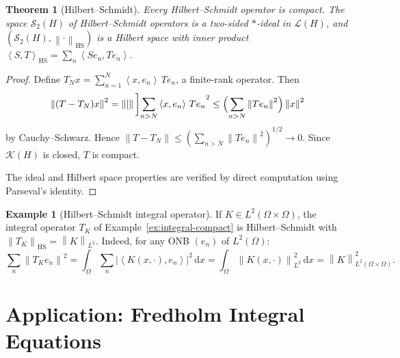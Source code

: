 \documentclass[a4paper,12pt]{book}
\newcommand{\dd}{\mathrm{d}}
\newcommand{\norm}[1]{\left\| #1 \right\|}
\newcommand{\abs}[1]{\left| #1 \right|}
\newcommand{\inner}[2]{\left\langle #1, #2 \right\rangle}
\theoremstyle{definition}
\newtheorem{example}[definition]{Example}
\theoremstyle{plain}
\newtheorem{theorem}[definition]{Theorem}
\theoremstyle{remark}
\begin{document}
\begin{theorem}[Hilbert--Schmidt]\label{thm:hilbert-schmidt}
Every Hilbert--Schmidt operator is compact. The space $\mathcal{S}_2(H)$ of
Hilbert--Schmidt operators is a two-sided $*$-ideal in $\mathcal{L}(H)$, and
$(\mathcal{S}_2(H), \norm{\cdot}_{\mathrm{HS}})$ is a Hilbert space with
inner product
$\inner{S}{T}_{\mathrm{HS}} = \sum_n \inner{Se_n}{Te_n}$.
\end{theorem}

\begin{proof}
Define $T_N x = \sum_{n=1}^N \inner{x}{e_n}\, Te_n$, a finite-rank operator. Then
\[
  \norm{(T - T_N)x}^2
  = \norm[\bigg]{\sum_{n > N} \inner{x}{e_n}\, Te_n}^2
  \le \Bigl(\sum_{n > N} \norm{Te_n}^2\Bigr) \norm{x}^2
\]
by Cauchy--Schwarz. Hence $\norm{T - T_N} \le (\sum_{n > N} \norm{Te_n}^2)^{1/2} \to 0$.
Since $\mathcal{K}(H)$ is closed, $T$ is compact.

The ideal and Hilbert space properties are verified by direct computation using
Parseval's identity.
\end{proof}

\begin{example}[Hilbert--Schmidt integral operator]\label{ex:hs-integral}
If $K \in L^2(\Omega \times \Omega)$, the integral operator $T_K$ of
Example~\ref{ex:integral-compact} is Hilbert--Schmidt with
$\norm{T_K}_{\mathrm{HS}} = \norm{K}_{L^2}$. Indeed, for any ONB $(e_n)$ of
$L^2(\Omega)$:
\[
  \sum_n \norm{T_K e_n}^2
  = \int_\Omega \sum_n \abs{\inner{K(x,\cdot)}{e_n}}^2\, \dd x
  = \int_\Omega \norm{K(x,\cdot)}_{L^2}^2\, \dd x
  = \norm{K}_{L^2(\Omega \times \Omega)}^2.
\]
\end{example}


\section{Application: Fredholm Integral Equations}\label{sec:fredholm-integral}

\end{document}
